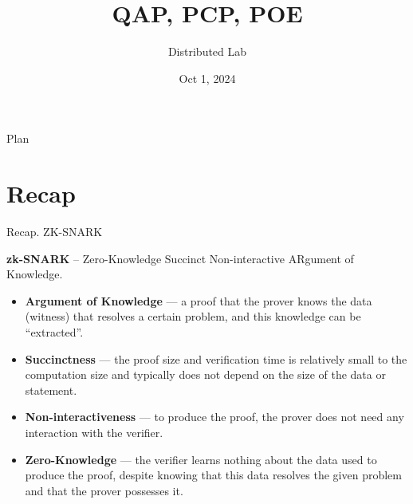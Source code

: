 \documentclass{zkdl-presentation-template}
\title[zk-SNARK I]{\textbf{QAP, PCP, POE}}
\author{Distributed Lab}
\date{Oct 1, 2024}
\begin{document}
    \frame {
        \titlepage
    }

    \begin{frame}{Plan}
        \tableofcontents
    \end{frame}

    \section{Recap}

    \begin{frame}{Recap. ZK-SNARK}
        \begin{definition}
            \textbf{zk-SNARK} – Zero-Knowledge Succinct Non-interactive ARgument of 
            Knowledge.
        \end{definition}
        \pause
        \begin{itemize}[itemsep=1pt]
            \item \textbf{Argument of Knowledge} --- a proof that the prover knows the data (witness) that resolves a certain
            problem, and this knowledge can be ``extracted''. \pause
            \item \textbf{Succinctness} --- the proof size and verification time is relatively small to the computation size and typically does not depend on the size of 
            the data or statement. \pause
            \item \textbf{Non-interactiveness} --- to produce the proof, the prover does not need any interaction
            with the verifier. \pause
            \item \textbf{Zero-Knowledge} --- the verifier learns nothing about the data used to produce the
            proof, despite knowing that this data resolves the given problem and that the prover possesses it.
        \end{itemize}
    \end{frame}
\end{document}
